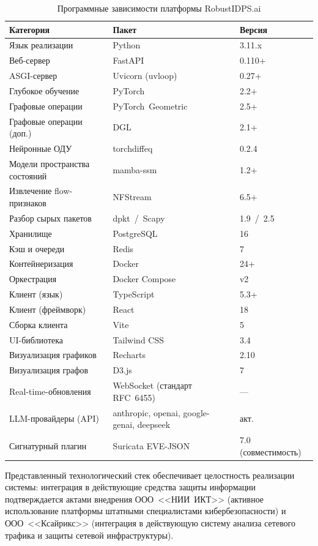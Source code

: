 \begin{table}[H]
\centering
\caption{Программные зависимости платформы RobustIDPS.ai}
\label{tab:packages_versions}
\small
\renewcommand{\arraystretch}{0.92}\begin{tabular}{@{}lll@{}}
\toprule
\textbf{Категория} & \textbf{Пакет} & \textbf{Версия} \\
\midrule
Язык реализации & Python & 3.11.x \\
Веб-сервер & FastAPI & 0.110+ \\
ASGI-сервер & Uvicorn (uvloop) & 0.27+ \\
Глубокое обучение & PyTorch & 2.2+ \\
Графовые операции & PyTorch~Geometric & 2.5+ \\
Графовые операции (доп.) & DGL & 2.1+ \\
Нейронные ОДУ & torchdiffeq & 0.2.4 \\
Модели пространства состояний & mamba-ssm & 1.2+ \\
Извлечение flow-признаков & NFStream & 6.5+ \\
Разбор сырых пакетов & dpkt~/~Scapy & 1.9~/~2.5 \\
Хранилище & PostgreSQL & 16 \\
Кэш и очереди & Redis & 7 \\
Контейнеризация & Docker & 24+ \\
Оркестрация & Docker Compose & v2 \\
Клиент (язык) & TypeScript & 5.3+ \\
Клиент (фреймворк) & React & 18 \\
Сборка клиента & Vite & 5 \\
UI-библиотека & Tailwind CSS & 3.4 \\
Визуализация графиков & Recharts & 2.10 \\
Визуализация графов & D3.js & 7 \\
Real-time-обновления & WebSocket (стандарт RFC~6455) & --- \\
LLM-провайдеры (API) & anthropic, openai, google-genai, deepseek & акт. \\
Сигнатурный плагин & Suricata EVE-JSON & 7.0 (совместимость) \\
\bottomrule
\end{tabular}
\end{table}

Представленный технологический стек обеспечивает целостность реализации системы: интеграция в действующие средства защиты информации подтверждается актами внедрения ООО~<<НИИ~ИКТ>> (активное использование платформы штатными специалистами кибербезопасности) и ООО~<<Ксайрикс>> (интеграция в действующую систему анализа сетевого трафика и защиты сетевой инфраструктуры).


